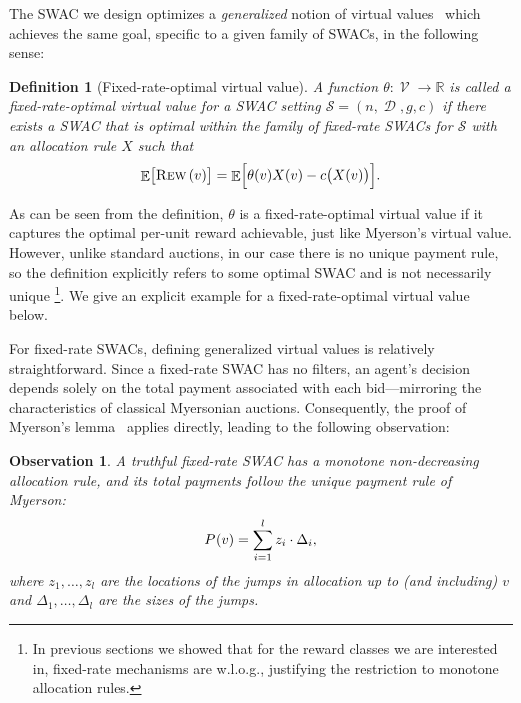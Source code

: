 \documentclass[11pt,letterpaper]{article}
\newcommand{\fr}{fixed-rate\xspace}
\newcommand{\swac}{SWAC\xspace}
\newcommand{\swacs}{SWACs\xspace}
\DeclareMathOperator*{\E}{\bb{E}}
\newcommand{\bb}[1]{\mathbb{#1}}
\DeclareMathOperator{\D}{\mathcal{D}}
\DeclareMathOperator{\V}{\mathcal{V}}
\newcommand{\g}{g}
\theoremstyle{plain}
\newtheorem{definition}{Definition}
\newtheorem{observation}{Observation}
\begin{document}
The \swac  we design optimizes a \emph{generalized} notion of virtual values~\cite{HartlineR08} 
which achieves the same goal, specific to a given family of \swacs,
in the following sense:
\begin{definition}[Fixed-rate-optimal virtual value]
\label{def:virtual}
A function \(\theta:\V\to\mathbb{R}\) is called a \emph{\fr-optimal virtual value} 
for a \swac setting \(\mathcal{S} = (n, \D, \g, c)\) 
if there exists a \swac that is optimal within the family of \fr \swacs 
for \(\mathcal{S}\) with an allocation rule \(X\) such that
\begin{equation}\label{eq:virv-reward}
    \E\bigl[\trew{v}\bigr] = \E\Bigl[\theta(v) X(v) - c\bigl(X(v)\bigr)\Bigr].
\end{equation}
\end{definition}

As can be seen from the definition, $\theta$
is a \fr-optimal virtual value if it captures the optimal per-unit reward achievable, just like Myerson's virtual value.
However, unlike standard auctions,
in our case there is no unique payment rule,
so the definition explicitly refers to some optimal \swac 
and is not necessarily unique \footnote{
    In previous sections we showed that for the reward classes we are interested in, \fr mechanisms are w.l.o.g., justifying the restriction to monotone allocation rules.
    }. We give an explicit example for a \fr-optimal virtual value below.


For \fr \swacs, defining generalized virtual values is relatively straightforward. Since a \fr \swac has no filters, an agent’s decision depends solely on the total payment associated with each bid—mirroring the characteristics of classical Myersonian auctions. Consequently, the proof of Myerson’s lemma~\cite{myerson1981optimal} applies directly, leading to the following observation:

\begin{observation}\label{ob:fr-means-myerson}
    A truthful \fr \swac has a monotone non-decreasing allocation rule, and its total payments follow the unique payment rule of Myerson:
    \begin{align}
        \p{v}=\sum_{i=1}^l z_i\cdot\Delta_i,
    \end{align}
    where $z_1,\dots,z_l$ are the locations of the jumps in allocation up to (and including) $v$ and $\Delta_1,\dots,\Delta_l$ are the sizes of the jumps.
\end{observation}
\end{document}
